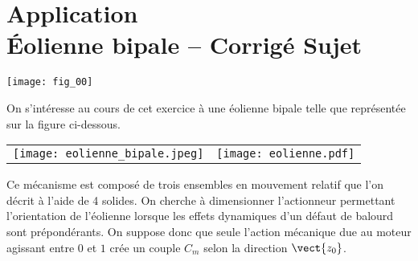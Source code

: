 \chapter*{Application  \\ 
Éolienne bipale -- \ifprof Corrigé \else Sujet \fi}

\iflivret {} \else
\ifprof  {} \else \fi
\fi


\setcounter{question}{0}
\begin{marginfigure}
\texttt{[image: fig\_00]}
\end{marginfigure}



\ifprof
\else
On s'intéresse au cours de cet exercice à une éolienne bipale telle que représentée sur la figure ci-dessous. 
\begin{center}
\begin{tabular}{cc}
\texttt{[image: eolienne\_bipale.jpeg]}
&
\texttt{[image: eolienne.pdf]}
\end{tabular}
\end{center}

Ce mécanisme est composé de trois ensembles en mouvement relatif que l'on décrit à l'aide de 4 solides.%
On cherche à dimensionner l'actionneur permettant l'orientation de l'éolienne lorsque les effets dynamiques d'un défaut de balourd sont prépondérants. 
%
On suppose donc que seule l'action mécanique due au moteur agissant entre $0$ et $1$  crée un couple $C_m$ selon la direction $\vect{z_0}$. 

